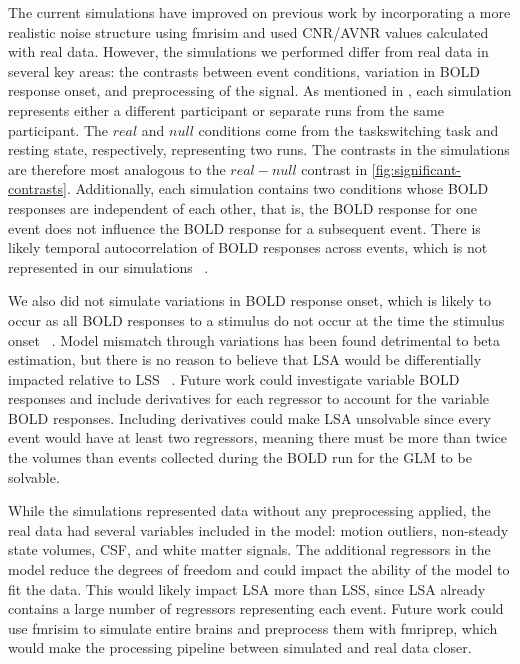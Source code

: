 \documentclass[10pt,letterpaper]{article}
\begin{document}
The current simulations have improved on previous work by incorporating a more
realistic noise structure using fmrisim and used CNR/AVNR values calculated with real data.
However, the simulations we performed differ from real data in several key areas: the contrasts between event conditions,
variation in BOLD response onset, and preprocessing of the signal.
As mentioned in , each simulation represents
either a different participant or separate runs from the same participant.
The $real$ and $null$ conditions come from the taskswitching task and resting state,
respectively, representing two runs.
The contrasts in the simulations are therefore most analogous to the $real - null$
contrast in \ref{fig:significant-contrasts}.
Additionally, each simulation contains two conditions whose BOLD responses
are independent of each other, that is, the BOLD response for one event
does not influence the BOLD response for a subsequent event.
There is likely temporal autocorrelation of BOLD responses across events,
which is not represented in our simulations ~\cite{Abdulrahman2016}.

We also did not simulate variations in BOLD response onset, which is likely to occur
as all BOLD responses to a stimulus do not occur at the time the stimulus onset ~\cite{DEsposito2003}.
Model mismatch through variations has been found detrimental to beta estimation, 
but there is no reason to believe that LSA would be differentially impacted relative to LSS ~\cite{Turner2012a}.
Future work could investigate variable BOLD responses and include derivatives for each regressor to account for
the variable BOLD responses.
Including derivatives could make LSA unsolvable since every event would have at least two regressors, meaning
there must be more than twice the volumes than events collected during the BOLD run
for the GLM to be solvable.

While the simulations represented data without any preprocessing applied,
the real data had several variables included in the model: motion outliers, non-steady state volumes,
CSF, and white matter signals.
The additional regressors in the model reduce the degrees of freedom
and could impact the ability of the model to fit the data.
This would likely impact LSA more than LSS, since LSA already contains
a large number of regressors representing each event.
Future work could use fmrisim to simulate entire brains and preprocess them with fmriprep,
which would make the processing pipeline between simulated and real data closer.
\end{document}
